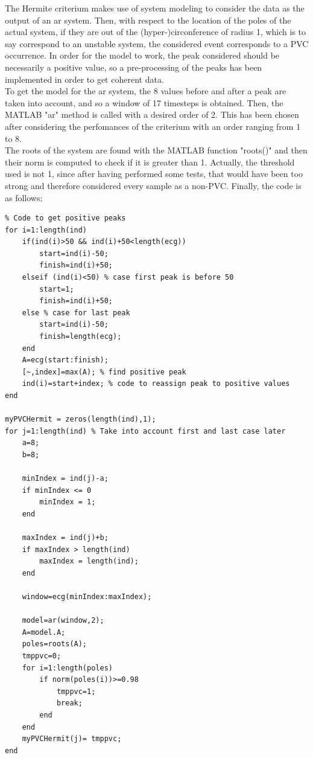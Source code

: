 \documentclass[a4paper,titlepage]{article}
\begin{document}
The Hermite criterium makes use of system modeling to consider the data as the output of an ar system. Then, with respect to the location of  the poles of the actual system, if they are out of the (hyper-)circonference of radius 1, which is to say correspond to an unstable system, the considered event corresponds to a PVC occurrence.
In order for the model to work, the peak considered should be necessarily a positive value, so a pre-processing of the peaks has been implemented in order to get coherent data.\\
To get the model for the ar system, the 8 values before and after a peak are taken into account, and so a window of 17 timesteps is obtained. Then, the MATLAB "ar" method is called with a desired order of 2. This has been chosen after considering the perfomances of the criterium with an order ranging from 1 to 8.\\
The roots of the system are found with the MATLAB function "roots()" and then their norm is computed to check if it is greater than 1. Actually, the threshold used is not 1, since after having performed some tests, that would have been too strong and therefore considered every sample as a non-PVC.
Finally, the code is as follows:
\begin{lstlisting}[caption=Hermite criterium]
% hermite
% Code to get positive peaks
for i=1:length(ind)
    if(ind(i)>50 && ind(i)+50<length(ecg))
        start=ind(i)-50;
        finish=ind(i)+50;
    elseif (ind(i)<50) % case first peak is before 50
        start=1;
        finish=ind(i)+50;
    else % case for last peak
        start=ind(i)-50;
        finish=length(ecg);
    end
    A=ecg(start:finish);
    [~,index]=max(A); % find positive peak
    ind(i)=start+index; % code to reassign peak to positive values
end

myPVCHermit = zeros(length(ind),1);
for j=1:length(ind) % Take into account first and last case later
    a=8;
    b=8;

    minIndex = ind(j)-a;
    if minIndex <= 0
        minIndex = 1;
    end

    maxIndex = ind(j)+b;
    if maxIndex > length(ind)
        maxIndex = length(ind);
    end

    window=ecg(minIndex:maxIndex);

    model=ar(window,2);
    A=model.A;
    poles=roots(A);
    tmppvc=0;
    for i=1:length(poles)
        if norm(poles(i))>=0.98
            tmppvc=1;
            break;
        end
    end
    myPVCHermit(j)= tmppvc;
end

\end{lstlisting}
\end{document}
